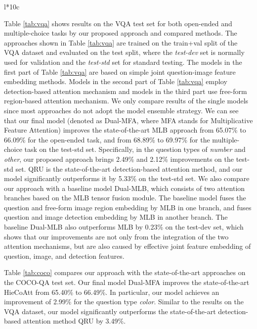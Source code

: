 \documentclass[letterpaper]{article}
\begin{document}
{\begin{table*}[th!]
\begin{tabular}{{l}*{10}{c}}
	\end{tabular}
	\caption{Evaluation results by our proposed method and compared methods on the VQA dataset.}
	\label{tab:vqa}
\end{table*}


Table \ref{tab:vqa} shows results on the VQA test set for both open-ended and multiple-choice tasks by our proposed approach and compared methods. The approaches shown in Table \ref{tab:vqa} are trained on the train+val split of the VQA dataset and evaluated on the test split, where the \textit{test-dev} set is normally used for validation and the \textit{test-std} set for standard testing. The models in the first part of Table \ref{tab:vqa} are based on simple joint question-image feature embedding methods. Models in the second part of Table \ref{tab:vqa} employ detection-based attention mechanism and models in the third part use free-form region-based attention mechanism. We only compare results of the single models since most approaches do not adopt the model ensemble strategy. We can see that our final model (denoted as Dual-MFA, where MFA stands for Multiplicative Feature Attention) improves the state-of-the-art MLB approach \cite{kim2016hadamard} from 65.07\% to 66.09\% for the open-ended task, and from 68.89\% to 69.97\% for the multiple-choice task on the test-std set. Specifically, in the question types of \textit{number} and \textit{other}, our proposed approach brings 2.49\% and 2.12\% improvements on the test-std set. QRU \cite{li2016visual} is the state-of-the-art detection-based attention method, and our model significantly outperforms it by 5.33\% on the test-std set. We also compare our approach with a baseline model Dual-MLB, which consists of two attention branches based on the MLB  tensor fusion module. The baseline model fuses the question and free-form image region embedding by MLB in one branch, and fuses question and image detection  embedding by MLB in another branch. The baseline Dual-MLB also outperforms MLB by 0.23\% on the test-dev set, which shows that our improvements are not only from the integration of the two attention mechanisms, but are also caused by effective joint feature embedding of question, image, and detection features.

Table \ref{tab:coco} compares our approach with the state-of-the-art approaches on the COCO-QA test set. Our final model Dual-MFA improves the state-of-the-art HieCoAtt \cite{lu2016hierarchical} from 65.40\% to 66.49\%. In particular, our model achieves an improvement of 2.99\% for the question type \textit{color}. Similar to the results on the VQA dataset, our model significantly outperforms the state-of-the-art detection-based attention method QRU by 3.49\%.



}
\end{document}
